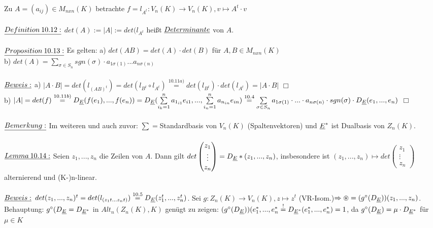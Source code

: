 \documentclass[fleqn, a4paper, 11pt]{scrartcl}
\theoremstyle{definition}
\begin{document}
Zu $A=(a_{ij})\in M_{nxn}(K)$ betrachte $f=l_{A^t}:V_n(K)\rightarrow V_n(K),v\mapsto A^t\cdot v$\\
\\
$\uline{Definition\:10.12:}$ $det(A):=|A|:=det(l_{A^t}$ heißt $\uline{Determinante}$ von $A$.\\
\\
$\uline{Proposition\:10.13:}$ Es gelten: a) $det(AB)=det(A)\cdot det(B)$ für $A,B\in M_{nxn}(K)$\\
b) $det(A)=\sum\limits_{\sigma\in S_n} sgn(\sigma)\cdot a_{1\sigma(1)}...a_{n\sigma(n)}$\\
\\
$\uline{Beweis:}$ a) $|A\cdot B|=det(l_{(AB)^t})=det(l_{B^t}\circ l_{A^t})\stackrel{10.11a)}{=}det(l_{B^t})\cdot det(l_{A^t})=|A\cdot B|$ \hfill $\Box$\\
b) $|A|=det(f)\stackrel{10.11b)}{=}D_{\uline{E}}(f(e_1),...,f(e_n))=D_{\uline{E}}(\sum\limits_{i_k =1}^n a_{1_{i1}}e_{i1},...,\sum\limits_{i_n  =1}^n a_{n_{in}}e_{in})\stackrel{10.4}{=}\sum\limits_{\sigma\in S_n} a_{1\sigma(1)}\cdot ...\cdot a_{n\sigma(n)}\cdot sgn(\sigma)\cdot D_{\uline{E}}(e_1,...,e_n)$ \hfill $\Box$\\
\\
$\uline{Bemerkung:}$ Im weiteren und auch zuvor: $\sum =$Standardbasis von $V_n(K)$ (Spaltenvektoren) und $\uline{E}^{\ast}$ ist Dualbasis von $Z_n(K)$.\\
\\
$\uline{Lemma\:10.14:}$ Seien $z_1,...,z_n$ die Zeilen von $A$. Dann gilt $det\begin{pmatrix}
	z_1\\
	\vdots\\
	z_n
\end{pmatrix}=D_{\uline{E}}\ast(z_1,...,z_n)$, insbesondere ist $(z_1,...,z_n)\mapsto det\begin{pmatrix}
	z_1\\
	\vdots\\
	z_n
\end{pmatrix}$ alternierend und (K-)n-linear.\\
\\
$\uline{Beweis:}$ $det(z_1,...,z_n)^t=det(l_{(z_1 t...z_n t)})\stackrel{10.5}{=}D_{\uline{E}}(z_1 ^t,...,z_n ^t)$. Sei $g:Z_n(K)\rightarrow V_n(K),z\mapsto z^t$ (VR-Isom.)$\Rightarrow \circledast=(g^{\circ}(D_{\uline{E}}))(z_1,...,z_n)$. Behauptung: $g^{\circ}(D_{\uline{E}}=D_{\uline{E}^{\ast}}$ in $Alt_n(Z_n(K),K)$ genügt zu zeigen: $(g^{\circ}(D_{\uline{E}}))(e_1^{\ast},...,e_n^{\ast}\stackrel{!}{=}D_{\uline{E}^{\ast}}(e_1^{\ast},...,e_n^{\ast})=1$, da $g^{\circ}(D_{\uline{E}})=\mu\cdot D_{\uline{E}^{\ast}}$ für $\mu\in K$\\
\end{document}
